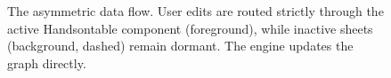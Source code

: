 \begin{figure}[h]
    \caption{The asymmetric data flow. User edits are routed strictly through the active Handsontable component (foreground), while inactive sheets (background, dashed) remain dormant. The engine updates the graph directly.}
    \label{fig:stacked_flow}
\end{figure}
